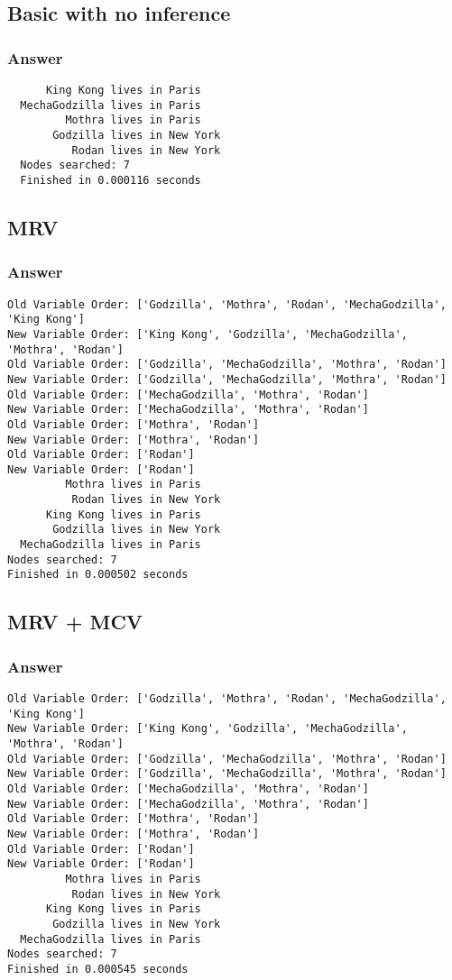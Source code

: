 \documentclass{article}
\begin{document}
  \subsection{Basic with no inference}
  \subsubsection{Answer}
  \begin{verbatim}
      King Kong lives in Paris
  MechaGodzilla lives in Paris
         Mothra lives in Paris
       Godzilla lives in New York
          Rodan lives in New York
  Nodes searched: 7
  Finished in 0.000116 seconds
  \end{verbatim}
  \subsection{MRV}
  \subsubsection{Answer}
  \begin{verbatim}
Old Variable Order: ['Godzilla', 'Mothra', 'Rodan', 'MechaGodzilla', 'King Kong']
New Variable Order: ['King Kong', 'Godzilla', 'MechaGodzilla', 'Mothra', 'Rodan']
Old Variable Order: ['Godzilla', 'MechaGodzilla', 'Mothra', 'Rodan']
New Variable Order: ['Godzilla', 'MechaGodzilla', 'Mothra', 'Rodan']
Old Variable Order: ['MechaGodzilla', 'Mothra', 'Rodan']
New Variable Order: ['MechaGodzilla', 'Mothra', 'Rodan']
Old Variable Order: ['Mothra', 'Rodan']
New Variable Order: ['Mothra', 'Rodan']
Old Variable Order: ['Rodan']
New Variable Order: ['Rodan']
         Mothra lives in Paris
          Rodan lives in New York
      King Kong lives in Paris
       Godzilla lives in New York
  MechaGodzilla lives in Paris
Nodes searched: 7
Finished in 0.000502 seconds
\end{verbatim}
  \subsection{MRV + MCV}
  \subsubsection{Answer}
  \begin{verbatim}
Old Variable Order: ['Godzilla', 'Mothra', 'Rodan', 'MechaGodzilla', 'King Kong']
New Variable Order: ['King Kong', 'Godzilla', 'MechaGodzilla', 'Mothra', 'Rodan']
Old Variable Order: ['Godzilla', 'MechaGodzilla', 'Mothra', 'Rodan']
New Variable Order: ['Godzilla', 'MechaGodzilla', 'Mothra', 'Rodan']
Old Variable Order: ['MechaGodzilla', 'Mothra', 'Rodan']
New Variable Order: ['MechaGodzilla', 'Mothra', 'Rodan']
Old Variable Order: ['Mothra', 'Rodan']
New Variable Order: ['Mothra', 'Rodan']
Old Variable Order: ['Rodan']
New Variable Order: ['Rodan']
         Mothra lives in Paris
          Rodan lives in New York
      King Kong lives in Paris
       Godzilla lives in New York
  MechaGodzilla lives in Paris
Nodes searched: 7
Finished in 0.000545 seconds
\end{verbatim}
\end{document}
